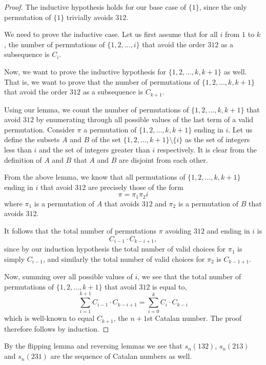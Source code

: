 \documentclass[11pt,letterpaper,twoside,english]{article}
\theoremstyle{theorem}
\theoremstyle{remark}
\begin{document}
\begin{proof}
The inductive hypothesis holds for our base case of $\{1\}$, since the only permutation of $\{1\}$ trivially avoids $312$.

We need to prove the inductive case. Let us first assume that for all $i$ from $1$ to $k$, the number of permutations of $\{1,2,...,i\}$ that avoid the order $312$ as a subsequence is $C_i$.

Now, we want to prove the inductive hypothesis for $\{1,2,...,k,k+1\}$ as well. That is, we want to prove that the number of permutations of $\{1,2,...,k,k+1\}$ that avoid the order $312$ as a subsequence is $C_{k+1}$.

Using our lemma, we count the number of permutations of $\{1,2,...,k,k+1\}$ that avoid $312$ by enumerating through all possible values of the last term of a valid permutation. Consider $\pi$ a permutation of $\{1,2,\ldots, k, k+1\}$ ending in $i$. Let us define the subsets $A$ and $B$ of the  set $\{1,2,...,k+1\} \setminus \{i\}$ as the set of integers less than $i$ and the set of integers greater than $i$ respectively. It is clear from the definition of $A$ and $B$ that $A$ and $B$ are disjoint from each other.

From the above lemma, we know that all permutations of $\{1,2,...,k,k+1\}$ ending in $i$ that avoid $312$ are precisely those of the form
$$\pi = \pi_1 \pi_2 i$$
where $\pi_1$ is a permutation of $A$ that avoids $312$ and $\pi_2$ is a permutation of $B$ that avoids $312$.

It follows that the total number of permutations $\pi$ avoiding $312$ and ending in $i$ is
$$C_{i-1} \cdot C_{k-i+1},$$
since by our induction hypothesis the total number of valid choices for $\pi_1$ is simply $C_{i-1}$, and similarly the total number of valid choices for $\pi_2$ is $C_{k-1+1}$.

Now, summing over all possible values of $i$, we see that the total number of permutations of $\{1,2,...,k+1\}$ that avoid $312$ is equal to,
$$\sum_{i=1}^{k+1} C_{i-1} \cdot C_{k-i+1} = \sum_{i=0}^k C_i \cdot C_{k-i}$$ which is well-known to equal $C_{k+1}$, the $n+1$st Catalan number. The proof  therefore follows by induction.


\end{proof}

By the flipping lemma and reversing lemmas we see that  $s_n(132)$, $s_n(213)$ and $s_n(231)$ are the sequence of Catalan numbers as well. 


\end{document}
